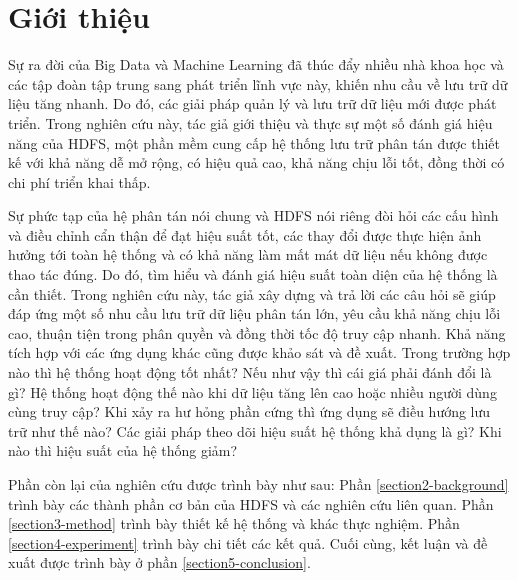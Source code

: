 \section{Giới thiệu}

Sự ra đời của Big Data và Machine Learning đã thúc đẩy nhiều nhà khoa học và các tập đoàn tập trung sang phát triển lĩnh vực này, khiến nhu cầu về lưu trữ dữ liệu tăng nhanh. Do đó, các giải pháp quản lý và lưu trữ dữ liệu mới được phát triển. Trong nghiên cứu này, tác giả giới thiệu và thực sự một số đánh giá hiệu năng của HDFS\cite{borthakur2007hadoop}, một phần mềm cung cấp hệ thống lưu trữ phân tán được thiết kế với khả năng dễ mở rộng, có hiệu quả cao, khả năng chịu lỗi tốt, đồng thời có chi phí triển khai thấp. 

Sự phức tạp của hệ phân tán nói chung và HDFS nói riêng đòi hỏi các cấu hình và điều chỉnh cẩn thận để đạt hiệu suất tốt, các thay đổi được thực hiện ảnh hưởng tới toàn hệ thống và có khả năng làm mất mát dữ liệu nếu không được thao tác đúng. Do đó, tìm hiểu và đánh giá hiệu suất toàn diện của hệ thống là cần thiết. Trong nghiên cứu này, tác giả xây dựng và trả lời các câu hỏi sẽ giúp đáp ứng một số nhu cầu lưu trữ dữ liệu phân tán lớn, yêu cầu khả năng chịu lỗi cao, thuận tiện trong phân quyền và đồng thời tốc độ truy cập nhanh. Khả năng tích hợp với các ứng dụng khác cũng được khảo sát và đề xuất. Trong trường hợp nào thì hệ thống hoạt động tốt nhất? Nếu như vậy thì cái giá phải đánh đổi là gì? Hệ thống hoạt động thế nào khi dữ liệu tăng lên cao hoặc nhiều người dùng cùng truy cập? Khi xảy ra hư hỏng phần cứng thì ứng dụng sẽ điều hướng lưu trữ như thế nào? Các giải pháp theo dõi hiệu suất hệ thống khả dụng là gì? Khi nào thì hiệu suất của hệ thống giảm?

Phần còn lại của nghiên cứu được trình bày như sau: Phần \ref{section2-background} trình bày các thành phần cơ bản của HDFS và các nghiên cứu liên quan. Phần \ref{section3-method} trình bày thiết kế hệ thống và khác thực nghiệm. Phần \ref{section4-experiment} trình bày chi tiết các kết quả. Cuối cùng, kết luận và đề xuất được trình bày ở phần \ref{section5-conclusion}.